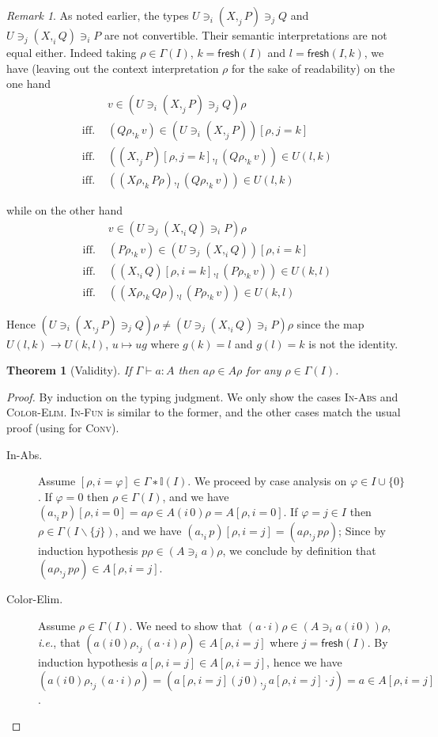 \documentclass[english]{PaperTools/latex/entcs}
\theoremstyle{plain}
\newtheorem{theorem}{Theorem}
\theoremstyle{definition}
\theoremstyle{remark}
\newtheorem*{remark}{Remark}
\newcommand\op[1]{∋_{#1}}
\def\fresh#1{\mathsf{fresh}(#1)}
\def\ie{\textit{i.e.}}
\begin{document}
\begin{remark}
  As noted earlier, the types
  $U \op i (X ,_j P) \op j Q$ and $U \op j (X ,_i Q) \op i P$
  are not convertible.
  Their semantic interpretations are not equal either.  Indeed
  taking $ρ ∈ Γ(I)$, $k = \fresh{I}$ and $l = \fresh{I,k}$,
  we have
  (leaving out the context interpretation $ρ$ for the sake of
  readability)
  on the one hand
  \begin{align*}
    &v ∈ (U \op i (X ,_j P) \op j Q) ρ
    \\
    \text{ iff. }& (Qρ ,_k v) ∈ (U \op i (X ,_j P))[ρ,j=k]
    \\
    \text{ iff. }& ((X ,_j P)[ρ,j=k] ,_l (Qρ ,_k v)) ∈ U(l,k)
    \\
    \text{ iff. }& ((Xρ ,_k Pρ) ,_l (Qρ ,_k v)) ∈ U(l,k)
  \end{align*}

  while on the other hand
  \begin{align*}
    &v ∈ (U \op j (X ,_i Q) \op i P) ρ
    \\
    \text{ iff. }& (Pρ ,_k v) ∈ (U \op j (X ,_i Q))[ρ,i=k]
    \\
    \text{ iff. }& ((X ,_i Q)[ρ,i=k] ,_l (Pρ ,_k v)) ∈ U(k,l)
    \\
    \text{ iff. }& ((Xρ ,_k Qρ) ,_l (Pρ ,_k v)) ∈ U(k,l)
  \end{align*}

  Hence $(U \op i (X ,_j P) \op j Q) ρ ≠ (U \op j (X ,_i Q) \op i P) ρ$
  since the map $U(l,k) → U(k,l)$, $u ↦ ug$ where $g(k) = l$ and $g(l)=k$
  is not the identity.
\end{remark}


\begin{theorem}[Validity]
  If $Γ ⊢ a : A$ then $aρ ∈ Aρ$ for any $ρ ∈ Γ(I)$.
\end{theorem}
\begin{proof}
  By induction on the typing judgment.  We only show the cases \textsc{In-Abs} and \textsc{Color-Elim}.  \textsc{In-Fun} is similar to the former, and the other
  cases match the usual proof (using  for \textsc{Conv}).
  \begin{description}
    \item[\sc In-Abs.]
      Assume $[ρ,i=φ] ∈ Γ∗𝕀(I)$.  We proceed by case analysis on $φ ∈ I ∪ \{0\}$.
      If $φ = 0$ then $ρ ∈ Γ(I)$, and we have
      $(a ,_i p)[ρ,i=0] = aρ ∈ A(i\,0)ρ = A[ρ,i=0]$.
      If $φ = j ∈ I$ then $ρ ∈ Γ(I\backslash\{j\})$, and we have
      $(a ,_i p)[ρ,i=j] = (aρ ,_j pρ)$;
      Since by induction hypothesis $pρ ∈ (A \op {i} a)ρ$, we conclude
      by definition that $(aρ ,_j pρ) ∈ A[ρ,i=j]$.

    \item[\sc Color-Elim.]
      Assume $ρ ∈ Γ(I)$.
      We need to show that $(a·i)ρ ∈ (A \op i {a(i\,0)})ρ$, \ie, that
      $ (a(i\,0)ρ ,_j (a·i)ρ) ∈ A[ρ,i=j]$ where $j = \fresh I$.
      By induction hypothesis $a[ρ,i=j] ∈ A[ρ,i=j]$, hence
      we have
      $(a(i\,0)ρ ,_j (a·i)ρ) = (a[ρ,i=j](j\,0) ,_j a[ρ,i=j]·j) = a ∈ A[ρ,i=j]$.
    \qedhere
  \end{description}

\end{proof}
\end{document}
